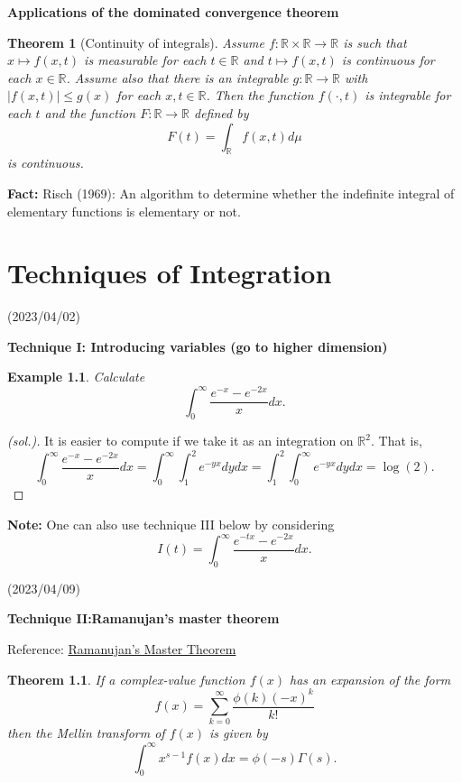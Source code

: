 \documentclass{book}
\newtheorem{thm}[defi]{Theorem}
\newtheorem{eg}[defi]{Example}
\numberwithin{equation}{section}
\begin{document}
\textbf{Applications of the dominated convergence theorem}
\begin{thm}[Continuity of integrals]
Assume $f: \mathbb{R}\times \mathbb{R}\rightarrow \mathbb{R}$ is such that $x\mapsto f(x,t)$ 
is measurable for each $t\in\mathbb{R}$ and $t \mapsto f(x, t)$ is continuous for each $x \in\mathbb{R}$. Assume also that there is an integrable $g : \mathbb{R}\rightarrow \mathbb{R}$ with $|f(x, t)| \leq g(x)$ for each $x, t \in\mathbb{R}$. Then the function
$f(\cdot, t)$ is integrable for each $t$ and the function $F: \mathbb{R} \rightarrow \mathbb{R}$ defined by
$$
F(t) = \int_{\mathbb{R}}f(x,t) d\mu
$$
is continuous.
\end{thm}

\textbf{Fact:} Risch (1969): An algorithm to determine whether the indefinite integral of elementary functions is elementary or not. 


\chapter{Techniques of Integration}
(2023/04/02)\medskip

\textbf{Technique I: Introducing variables (go to higher dimension)}
\begin{eg}
    Calculate 
    $$
     \int_0^\infty \frac{e^{-x}-e^{-2x}}{x} dx.
    $$
\end{eg}
\begin{proof}[(sol.)]
    It is easier to compute if we take it as an integration on $\mathbb{R}^2.$ That is,
    $$
    \int_0^\infty \frac{e^{-x}-e^{-2x}}{x} dx =\int_0^\infty \int_1^2 e^{-yx} dydx = \int_1^2 \int_0^\infty  e^{-yx} dydx=\log(2).
    $$
\end{proof}

\textbf{Note:} One can also use technique III below by considering
\[
I(t)=\int_0^\infty \frac{e^{-tx}-e^{-2x}}{x} dx.
\]

(2023/04/09)\medskip

\textbf{Technique II:Ramanujan's master theorem}

Reference: \href{http://arminstraub.com/downloads/pub/rmt.pdf}{Ramanujan's Master Theorem}
\begin{thm}\label{MasterThm}
    If a complex-value function $f(x)$ has an expansion of the form
    $$
    f(x)=\sum_{k=0}^\infty \frac{\phi(k)(-x)^k}{k!}
    $$ then the Mellin transform of $f(x)$ is given by
    $$
        \int_0^\infty x^{s-1}f(x)dx=\phi(-s)\Gamma(s).
    $$
\end{thm}
\end{document}
